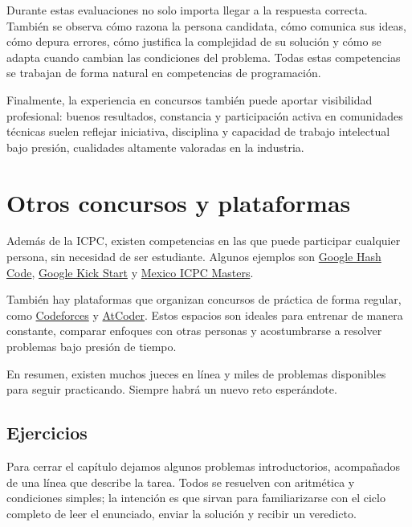 Durante estas evaluaciones no solo importa llegar a la respuesta correcta. También se observa cómo razona la persona candidata, cómo comunica sus ideas, cómo depura errores, cómo justifica la complejidad de su solución y cómo se adapta cuando cambian las condiciones del problema. Todas estas competencias se trabajan de forma natural en competencias de programación.

Finalmente, la experiencia en concursos también puede aportar visibilidad profesional: buenos resultados, constancia y participación activa en comunidades técnicas suelen reflejar iniciativa, disciplina y capacidad de trabajo intelectual bajo presión, cualidades altamente valoradas en la industria.

\section{Otros concursos y plataformas}

Además de la ICPC, existen competencias en las que puede participar cualquier persona, sin necesidad de ser estudiante. Algunos ejemplos son \href{https://codingcompetitions.withgoogle.com/hashcode}{Google Hash Code}, \href{https://codingcompetitions.withgoogle.com/kickstart}{Google Kick Start} y \href{https://blogs.iteso.mx/acm/2022/01/19/convocatoria-y-agenda-del-icpcmastersmx2022/}{Mexico ICPC Masters}.

También hay plataformas que organizan concursos de práctica de forma regular, como \href{https://codeforces.com}{Codeforces} y \href{https://atcoder.jp}{AtCoder}. Estos espacios son ideales para entrenar de manera constante, comparar enfoques con otras personas y acostumbrarse a resolver problemas bajo presión de tiempo.

En resumen, existen muchos jueces en línea y miles de problemas disponibles para seguir practicando. Siempre habrá un nuevo reto esperándote.

\subsection{Ejercicios}

Para cerrar el capítulo dejamos algunos problemas introductorios, acompañados de una línea que describe la tarea. Todos se resuelven con aritmética y condiciones simples; la intención es que sirvan para familiarizarse con el ciclo completo de leer el enunciado, enviar la solución y recibir un veredicto.

